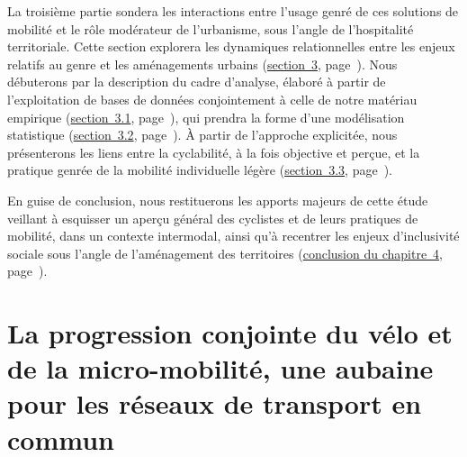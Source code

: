 \begin{refsegment}
La troisième partie sondera les interactions entre l'usage genré de ces solutions de mobilité et le rôle modérateur de l'urbanisme, sous l'angle de l'hospitalité territoriale. Cette section explorera les dynamiques relationnelles entre les enjeux relatifs au genre et les aménagements urbains (\hyperref[section-chap4:cyclabilite-genre]{section~3}, page~\pageref{section-chap4:cyclabilite-genre}). Nous débuterons par la description du cadre d'analyse, élaboré à partir de l'exploitation de bases de données conjointement à celle de notre matériau empirique (\hyperref[chap4:materiau-empirique-genre]{section~3.1}, page~\pageref{chap4:materiau-empirique-genre}), qui prendra la forme d'une modélisation statistique (\hyperref[chap4:methodologie-modele-ols]{section~3.2}, page~\pageref{chap4:methodologie-modele-ols}). À partir de l'approche explicitée, nous présenterons les liens entre la cyclabilité, à la fois objective et perçue, et la pratique genrée de la mobilité individuelle légère (\hyperref[section-chap4:cyclabilite-territoires-genre]{section~3.3}, page~\pageref{section-chap4:cyclabilite-territoires-genre}).%

En guise de conclusion, nous restituerons les apports majeurs de cette étude veillant à esquisser un aperçu général des cyclistes et de leurs pratiques de mobilité, dans un contexte intermodal, ainsi qu'à recentrer les enjeux d'inclusivité sociale sous l'angle de l'aménagement des territoires (\hyperref[chap4:conclusion]{conclusion du chapitre~4}, page~\pageref{chap4:conclusion}).%


    \newpage
\section{La progression conjointe du vélo et de la micro-mobilité, une aubaine pour les réseaux de transport en commun
    \label{section-chap4:progression-velo-micromobilite-aubaine}
    }


\end{refsegment}
